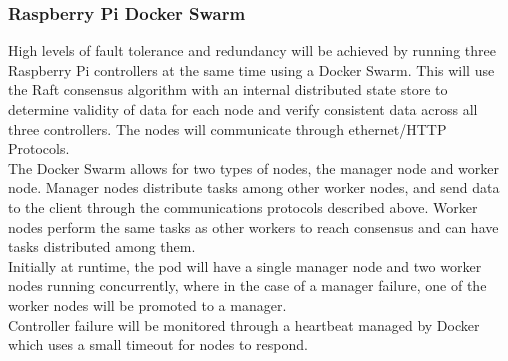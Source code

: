 \documentclass[main.tex]{subfiles}
\begin{document}
    \subsubsection{Raspberry Pi Docker Swarm}
    High levels of fault tolerance and redundancy will be achieved by running three Raspberry Pi controllers at the same time using a Docker Swarm. This will use the Raft consensus algorithm with an internal distributed state store to determine validity of data for each node and verify consistent data across all three controllers. The nodes will communicate through ethernet/HTTP Protocols.\\
    The Docker Swarm allows for two types of nodes, the manager node and worker node. Manager nodes distribute tasks among other worker nodes, and send data to the client through the communications protocols described above. Worker nodes perform the same tasks as other workers to reach consensus and can have tasks distributed among them.\\
    Initially at runtime, the pod will have a single manager node and two worker nodes running concurrently, where in the case of a manager failure, one of the worker nodes will be promoted to a manager.\\
    Controller failure will be monitored through a heartbeat managed by Docker which uses a small timeout for nodes to respond.
\end{document}

